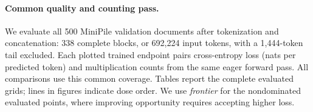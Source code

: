 \paragraph{Common quality and counting pass.}
We evaluate all 500 MiniPile validation documents after tokenization and
concatenation: 338 complete blocks, or 692,224 input tokens, with a
1,444-token tail excluded. Each plotted trained endpoint pairs cross-entropy
loss (nats per predicted token) and multiplication counts from the same eager forward pass.
All comparisons use this common coverage. Tables report the complete
evaluated grids; lines in figures indicate dose order. We use
\emph{frontier} for the nondominated evaluated points, where improving
opportunity requires accepting higher loss.

